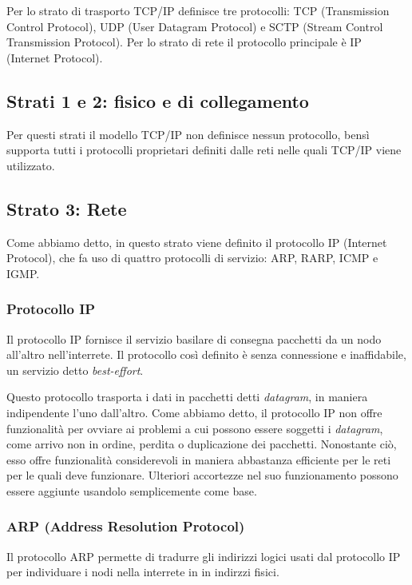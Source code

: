     Per lo strato di trasporto TCP/IP definisce tre protocolli: TCP (Transmission Control Protocol), UDP (User Datagram Protocol) e SCTP (Stream Control Transmission Protocol). Per lo strato di rete il protocollo principale è IP (Internet Protocol).
    
    \subsection{Strati 1 e 2: fisico e di collegamento}
        Per questi strati il modello TCP/IP non definisce nessun protocollo, bensì supporta tutti i protocolli proprietari definiti dalle reti nelle quali TCP/IP viene utilizzato.
        
    \subsection{Strato 3: Rete}
        Come abbiamo detto, in questo strato viene definito il protocollo IP (Internet Protocol), che fa uso di quattro protocolli di servizio: ARP, RARP, ICMP e IGMP.
        
        \subsubsection{Protocollo IP}
            Il protocollo IP fornisce il servizio basilare di consegna pacchetti da un nodo all'altro nell'interrete. Il protocollo così definito è senza connessione e inaffidabile, un servizio detto \textit{best-effort}.
            
            Questo protocollo trasporta i dati in pacchetti detti \textit{datagram}, in maniera indipendente l'uno dall'altro. Come abbiamo detto, il protocollo IP non offre funzionalità per ovviare ai problemi a cui possono essere soggetti i \textit{datagram}, come arrivo non in ordine, perdita o duplicazione dei pacchetti. Nonostante ciò, esso offre funzionalità considerevoli in maniera abbastanza efficiente per le reti per le quali deve funzionare. Ulteriori accortezze nel suo funzionamento possono essere aggiunte usandolo semplicemente come base.
            
        \subsubsection{ARP (Address Resolution Protocol)}
            Il protocollo ARP permette di tradurre gli indirizzi logici usati dal protocollo IP per individuare i nodi nella interrete in in indirzzi fisici.
            
